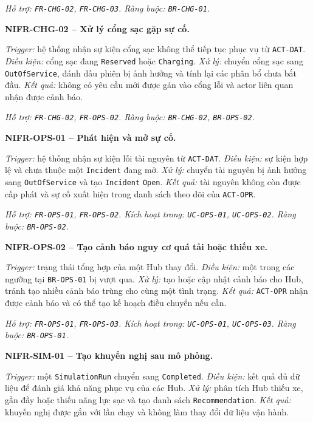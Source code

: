 \textit{Hỗ trợ: \texttt{FR-CHG-02}, \texttt{FR-CHG-03}. Ràng buộc: \texttt{BR-CHG-01}.}

\medskip
\noindent\textbf{NIFR-CHG-02 -- Xử lý cổng sạc gặp sự cố.}\par
\nopagebreak[4]
\textit{Trigger:} hệ thống nhận sự kiện cổng sạc không thể tiếp tục phục vụ từ \texttt{ACT-DAT}. \textit{Điều kiện:} cổng sạc đang \texttt{Reserved} hoặc \texttt{Charging}. \textit{Xử lý:} chuyển cổng sạc sang \texttt{OutOfService}, đánh dấu phiên bị ảnh hưởng và tính lại các phân bổ chưa bắt đầu. \textit{Kết quả:} không có yêu cầu mới được gán vào cổng lỗi và actor liên quan nhận được cảnh báo.

\textit{Hỗ trợ: \texttt{FR-CHG-02}, \texttt{FR-OPS-02}. Ràng buộc: \texttt{BR-CHG-02}, \texttt{BR-OPS-02}.}

\medskip
\noindent\textbf{NIFR-OPS-01 -- Phát hiện và mở sự cố.}\par
\nopagebreak[4]
\textit{Trigger:} hệ thống nhận sự kiện lỗi tài nguyên từ \texttt{ACT-DAT}. \textit{Điều kiện:} sự kiện hợp lệ và chưa thuộc một \texttt{Incident} đang mở. \textit{Xử lý:} chuyển tài nguyên bị ảnh hưởng sang \texttt{OutOfService} và tạo \texttt{Incident} \texttt{Open}. \textit{Kết quả:} tài nguyên không còn được cấp phát và sự cố xuất hiện trong danh sách theo dõi của \texttt{ACT-OPR}.

\textit{Hỗ trợ: \texttt{FR-OPS-01}, \texttt{FR-OPS-02}. Kích hoạt trong: \texttt{UC-OPS-01}, \texttt{UC-OPS-02}. Ràng buộc: \texttt{BR-OPS-02}.}

\medskip
\noindent\textbf{NIFR-OPS-02 -- Tạo cảnh báo nguy cơ quá tải hoặc thiếu xe.}\par
\nopagebreak[4]
\textit{Trigger:} trạng thái tổng hợp của một Hub thay đổi. \textit{Điều kiện:} một trong các ngưỡng tại \texttt{BR-OPS-01} bị vượt qua. \textit{Xử lý:} tạo hoặc cập nhật cảnh báo cho Hub, tránh tạo nhiều cảnh báo trùng cho cùng một tình trạng. \textit{Kết quả:} \texttt{ACT-OPR} nhận được cảnh báo và có thể tạo kế hoạch điều chuyển nếu cần.

\textit{Hỗ trợ: \texttt{FR-OPS-01}, \texttt{FR-OPS-03}. Kích hoạt trong: \texttt{UC-OPS-01}, \texttt{UC-OPS-03}. Ràng buộc: \texttt{BR-OPS-01}.}

\medskip
\noindent\textbf{NIFR-SIM-01 -- Tạo khuyến nghị sau mô phỏng.}\par
\nopagebreak[4]
\textit{Trigger:} một \texttt{SimulationRun} chuyển sang \texttt{Completed}. \textit{Điều kiện:} kết quả đủ dữ liệu để đánh giá khả năng phục vụ của các Hub. \textit{Xử lý:} phân tích Hub thiếu xe, gần đầy hoặc thiếu năng lực sạc và tạo danh sách \texttt{Recommendation}. \textit{Kết quả:} khuyến nghị được gắn với lần chạy và không làm thay đổi dữ liệu vận hành.

